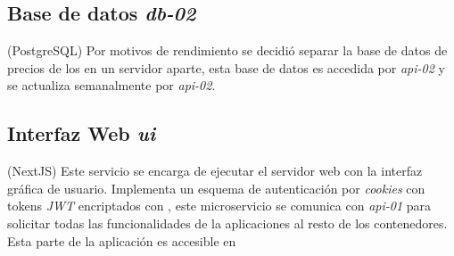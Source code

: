 \subsection{Base de datos \emph{db-02}} (PostgreSQL)
Por motivos de rendimiento se decidió separar la base de datos de precios de los  en un servidor aparte, esta base de datos es accedida por \emph{api-02} y se actualiza semanalmente por \emph{api-02}.

\subsection{Interfaz Web \emph{ui}} (NextJS)
Este servicio se encarga de ejecutar el servidor web con la interfaz gráfica de usuario. Implementa un esquema de autenticación por \emph{cookies} con tokens \emph{JWT} encriptados con , este microservicio se comunica con \emph{api-01} para solicitar todas las funcionalidades de la aplicaciones al resto de los contenedores. Esta parte de la aplicación es accesible en

